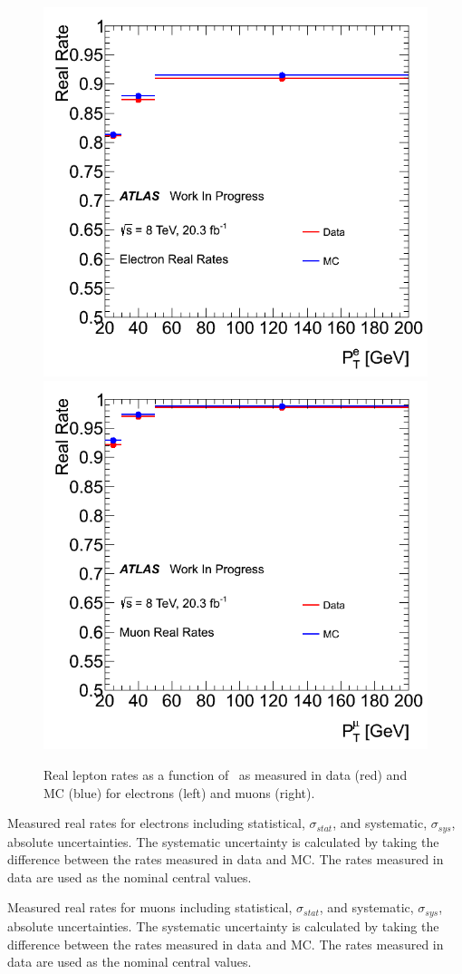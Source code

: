 \begin{figure}[tb]
\centering
\includegraphics[width=0.495\columnwidth]{figures/fakes_bkg/Efficiencies/ElectronRealRates.png}
\includegraphics[width=0.495\columnwidth]{figures/fakes_bkg/Efficiencies/MuonRealRates.png}
\caption{Real lepton rates as a function of \pt\ as measured in data (red) and MC (blue) for electrons (left) and muons (right).}
\label{fig:realEff}
\end{figure}


\begin{table}[tb]
\centering

\caption{Measured real rates for electrons including statistical, $\sigma_{stat}$,
and systematic, $\sigma_{sys}$, absolute uncertainties. 
The systematic uncertainty is calculated by taking the difference
between the rates measured in data and MC.  The rates measured in data are used as the nominal central values.  } 
\label{tab:realEff_El}
\end{table} 

\begin{table}[tb]
\centering

\caption{Measured real rates for muons including statistical, $\sigma_{stat}$,
and systematic, $\sigma_{sys}$, absolute uncertainties. 
The systematic uncertainty is calculated by taking the difference
between the rates measured in data and MC.  The rates measured in data are used as the nominal central values.  } 
\label{tab:realEff_Mu}
\end{table} 


